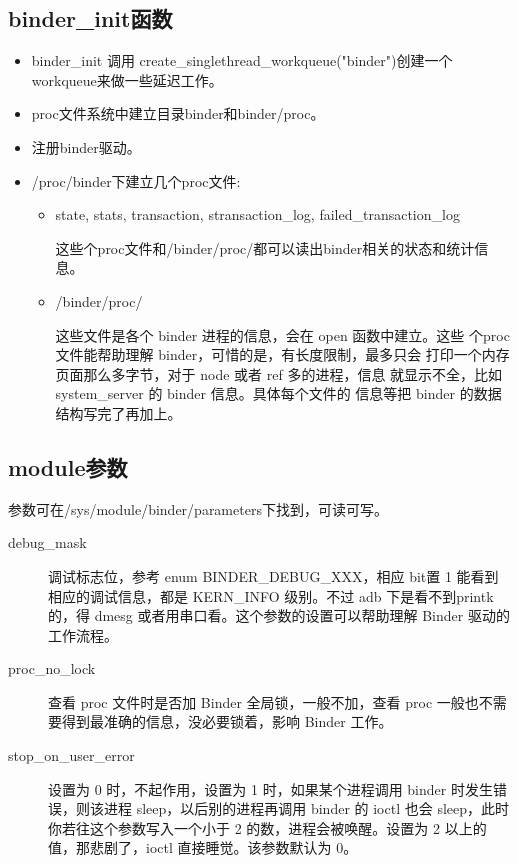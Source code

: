 \documentclass[a4paper,11pt]{article}
\begin{document}
\subsection{binder_init函数} 
\begin{itemize}
    \item binder_init 调用 create_singlethread_workqueue("binder")创建一个workqueue来做一些延迟工作。
    \item proc文件系统中建立目录binder和binder/proc。
    \item 注册binder驱动。
    \item /proc/binder下建立几个proc文件:
        \begin{itemize}
            \item state, stats, transaction, stransaction_log, failed_transaction_log

                这些个proc文件和/binder/proc/都可以读出binder相关的状态和统计信息。
            \item /binder/proc/

                 这些文件是各个 binder 进程的信息，会在 open 函数中建立。这些
                 个proc 文件能帮助理解 binder，可惜的是，有长度限制，最多只会
                 打印一个内存页面那么多字节，对于 node 或者 ref 多的进程，信息
                 就显示不全，比如 system_server 的 binder 信息。具体每个文件的
                 信息等把 binder 的数据结构写完了再加上。
        \end{itemize}

\end{itemize}

\subsection{module参数} 
参数可在/sys/module/binder/parameters下找到，可读可写。
\begin{description}
    \item[debug_mask]调试标志位，参考 enum BINDER_DEBUG_XXX，相应 bit置 1 能看到相应的调试信息，都是 KERN_INFO 级别。不过 adb 下是看不到printk 的，得 dmesg 或者用串口看。这个参数的设置可以帮助理解 Binder 驱动的工作流程。
    \item[proc_no_lock] 查看 proc 文件时是否加 Binder 全局锁，一般不加，查看 proc 一般也不需要得到最准确的信息，没必要锁着，影响 Binder 工作。
    \item[stop_on_user_error]\label{paramstop} 设置为 0 时，不起作用，设置为 1 时，如果某个进程调用 binder 时发生错误，则该进程 sleep，以后别的进程再调用 binder 的 ioctl 也会 sleep，此时你若往这个参数写入一个小于 2 的数，进程会被唤醒。设置为 2 以上的值，那悲剧了，ioctl 直接睡觉。该参数默认为 0。
\end{description}
\end{document}

